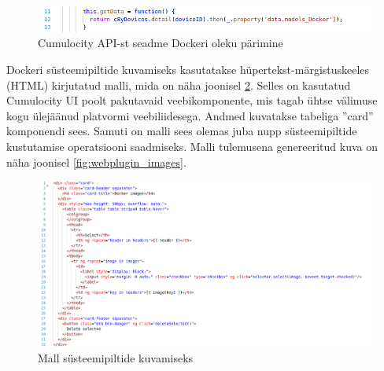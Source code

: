 \documentclass[12pt]{article}
\begin{document}
 \begin{figure} [ht] %
 \begin{center}
 \includegraphics[width=1\textwidth]{webplugin_getimages}
 \caption{Cumulocity API-st seadme Dockeri oleku pärimine}
 \label{fig:webplugin_getimages}
 \end{center}
 \end{figure}
 
 \FloatBarrier

 Dockeri süsteemipiltide kuvamiseks kasutatakse hüpertekst-märgistuskeeles (HTML) kirjutatud
 malli, mida on näha joonisel \ref{fig:webplugin_images_template}. Selles on kasutatud Cumulocity UI poolt pakutavaid veebikomponente, mis tagab
 ühtse välimuse kogu ülejäänud platvormi veebiliidesega. Andmed
 kuvatakse tabeliga ''card'' komponendi sees. Samuti on malli sees olemas juba nupp süsteemipiltide kustutamise
 operatsiooni saadmiseks. Malli tulemusena genereeritud kuva on näha joonisel \ref{fig:webplugin_images}.

 \begin{figure} [ht] %
 \begin{center}
 \includegraphics[width=1\textwidth]{webplugin_images_template}
 \caption{Mall süsteemipiltide kuvamiseks}
 \label{fig:webplugin_images_template}
 \end{center}
 \end{figure}
 
 \FloatBarrier
\end{document}
